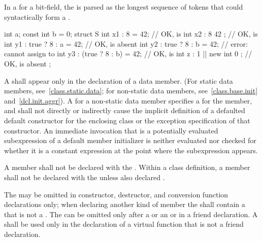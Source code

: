 \pnum
In a  for a bit-field,
the  is parsed as
the longest sequence of tokens
that could syntactically form a .
\begin{example}
\begin{codeblock}
int a;
const int b = 0;
struct S {
  int x1 : 8 = 42;              // OK,  is 
  int x2 : 8 { 42 };            // OK,  is 
  int y1 : true ? 8 : a = 42;   // OK,  is absent
  int y2 : true ? 8 : b = 42;   // error: cannot assign to 
  int y3 : (true ? 8 : b) = 42; // OK,  is 
  int z : 1 || new int { 0 };   // OK,  is absent
};
\end{codeblock}
\end{example}

\pnum
A  shall appear only in the
declaration of a data member. (For static data members,
see~\ref{class.static.data}; for non-static data members,
see~\ref{class.base.init} and~\ref{dcl.init.aggr}).
A  for a non-static data member
%
specifies a  for the member, and
shall not directly or indirectly cause the implicit definition of a
defaulted default constructor for the enclosing class or the
exception specification of that constructor.
An immediate invocation that
is a potentially evaluated subexpression
of a default member initializer
is neither evaluated nor checked for whether it
is a constant expression at the point where the subexpression appears.

\pnum
A member shall not be declared with the 
. Within a class definition, a member shall not be declared with the   unless also declared .

\pnum
The  may be omitted in constructor, destructor,
and conversion function declarations only;
when declaring another kind of member the 
shall contain a  that is not a .
The
 can be omitted only after a
 or an  or in a
friend declaration. A
 shall be used only in the declaration of a
virtual function
that is not a friend declaration.

